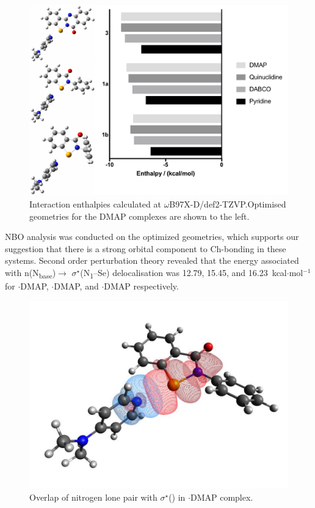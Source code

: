 \begin{refsection}
    \begin{figure}
      \centering
      \includegraphics[width=0.8\linewidth]{Figures/dft-energies.pdf}
      \caption[Interaction energies for various complexes.]{Interaction enthalpies calculated at $ \omega $B97X-D/def2-TZVP.\@ Optimised geometries for the DMAP complexes are shown to the left.}
    \end{figure}
    
    NBO analysis was conducted on the optimized geometries, which supports our suggestion that there is a strong orbital component to Ch-bonding in these systems.
    Second order perturbation theory revealed that the energy associated with n(N\textsubscript{base})$ \rightarrow $ $ \sigma^{\star} $(N\textsubscript{1}--Se) delocalisation was 12.79, 15.45, and 16.23~kcal$\cdot$mol$^{-1}$ for $ \cdot $DMAP, $ \cdot $DMAP, and $ \cdot $DMAP respectively.
    
    \begin{figure}
      \centering
      \includegraphics[width=0.6\linewidth]{Figures/phenyl-dmap-overlap.pdf}
      \caption[Orbital overlap for $ \cdot $DMAP.]{Overlap of nitrogen lone pair with $ \sigma^{\star} $() in $ \cdot $DMAP complex.}\label{fig:phenyl-dmap-overlap}
    \end{figure}
    

\end{refsection}
